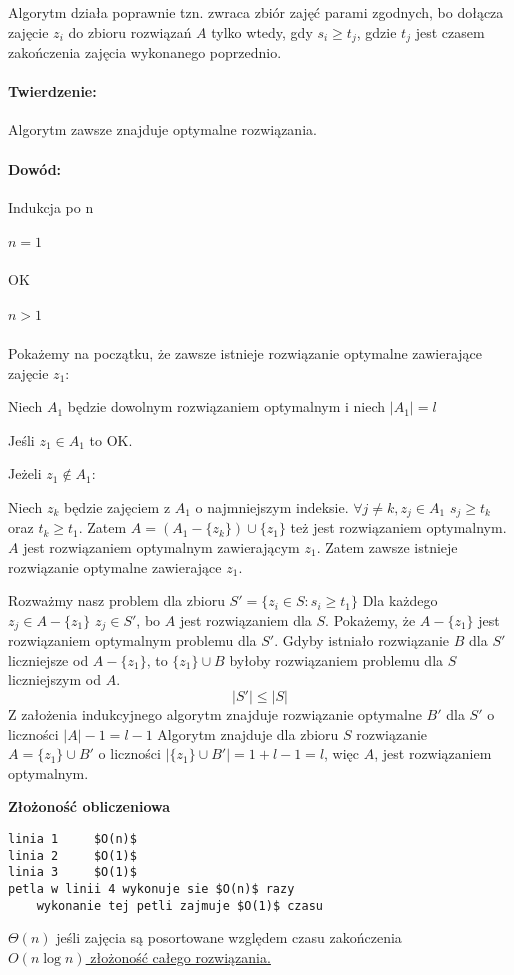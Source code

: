 Algorytm działa poprawnie tzn. zwraca zbiór zajęć parami zgodnych, bo dołącza zajęcie $z_i$ do zbioru rozwiązań $A$ tylko wtedy, gdy $s_i \geq t_j$, gdzie $t_j$ jest czasem zakończenia zajęcia wykonanego poprzednio.

\paragraph{Twierdzenie:} {Algorytm zawsze znajduje optymalne rozwiązania.}
\paragraph{Dowód:} {Indukcja po n}

\subparagraph{$n = 1$}
	OK
\subparagraph{$n > 1$}{Pokażemy na początku, że zawsze istnieje rozwiązanie optymalne zawierające zajęcie $z_1$:

Niech $A_1$ będzie dowolnym rozwiązaniem optymalnym i niech $\vert A_1\vert = l$ 

Jeśli $z_1 \in A_1$ to OK.

Jeżeli $z_1 \not\in A_1$:

Niech $z_k$ będzie zajęciem z $A_1$ o najmniejszym indeksie. $\forall{j} \neq k, z_j \in A_1$ $s_j \geq t_k$ oraz $t_k \geq t_1$. 
Zatem $A = (A_1 - \lbrace z_k\rbrace ) \cup \lbrace z_1 \rbrace $ też jest rozwiązaniem optymalnym. $A$ jest rozwiązaniem optymalnym zawierającym $z_1$. Zatem zawsze istnieje rozwiązanie optymalne zawierające $z_1$.}

Rozważmy nasz problem dla zbioru $S' = \lbrace z_i \in S: s_i \geq t_1 \rbrace$ Dla każdego $z_j \in A - \lbrace z_1 \rbrace$ $z_j \in S'$, bo $A$ jest rozwiązaniem dla $S$. Pokażemy, że $A - \lbrace z_1 \rbrace$ jest rozwiązaniem optymalnym problemu dla $S'$. Gdyby istniało rozwiązanie $B$ dla $S'$ liczniejsze od $A - \lbrace z_1 \rbrace$, to $\lbrace z_1 \rbrace \cup B$ byłoby rozwiązaniem problemu dla $S$ liczniejszym od $A$.
$$\vert S' \vert \leq \vert S \vert$$
Z założenia indukcyjnego algorytm znajduje rozwiązanie optymalne $B'$ dla $S'$ o liczności $\vert A \vert - 1 = l - 1$
Algorytm znajduje dla zbioru $S$ rozwiązanie $A = \lbrace z_1 \rbrace \cup B'$ o liczności $\vert \lbrace z_1 \rbrace \cup B' \vert = 1 + l - 1 = l$, więc $A$, jest rozwiązaniem optymalnym.

 
\textbf{Złożoność obliczeniowa}
\begin{lstlisting}
linia 1		$O(n)$
linia 2 	$O(1)$
linia 3 	$O(1)$
petla w linii 4 wykonuje sie $O(n)$ razy
	wykonanie tej petli zajmuje $O(1)$ czasu
\end{lstlisting}

$\Theta(n)$ jeśli zajęcia są posortowane względem czasu zakończenia \\
\underline{$O(n \log n )$ złożoność całego rozwiązania.}


